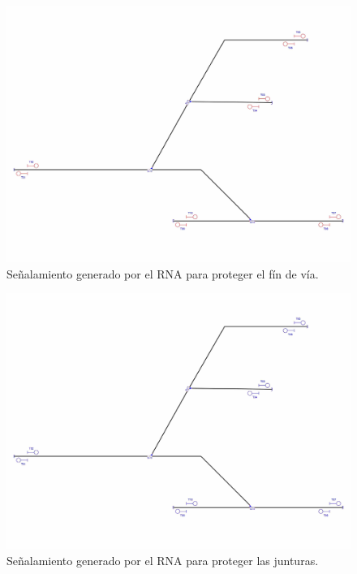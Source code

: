     \begin{figure}[h]
        \centering
        \includegraphics[width=1\textwidth]{resultados-obtenidos/ejemplo7/images/7_step1.png}
        \centering\caption{Señalamiento generado por el RNA para proteger el fín de vía.}
    \end{figure}

    \begin{figure}[h]
        \centering
        \includegraphics[width=1\textwidth]{resultados-obtenidos/ejemplo7/images/7_step2.png}
        \centering\caption{Señalamiento generado por el RNA para proteger las junturas.}
    \end{figure}


